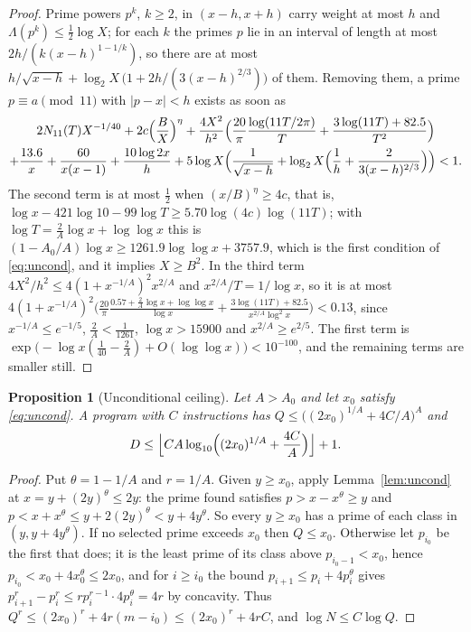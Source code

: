\documentclass[11pt]{article}
\newtheorem{proposition}[theorem]{Proposition}
\theoremstyle{remark}
\begin{document}
\begin{proof}
Prime powers $p^k$, $k\ge2$, in $(x-h,x+h)$ carry weight at most $h$ and
$\Lambda(p^k)\le\frac12\log X$; for each $k$ the primes $p$ lie in an
interval of length at most $2h/(k(x-h)^{1-1/k})$, so there are at most
$h/\sqrt{x-h}+\log_2X\,\bigl(1+2h/(3(x-h)^{2/3})\bigr)$ of them.  Removing
them, a prime $p\equiv a\pmod{11}$ with $|p-x|<h$ exists as soon as
\begin{multline*}
  2N_{11}(T)X^{-1/40}+2c\Bigl(\frac BX\Bigr)^\eta
  +\frac{4X^2}{h^2}\Bigl(\frac{20}\pi\frac{\log(11T/2\pi)}T
  +\frac{3\log(11T)+82.5}{T^2}\Bigr)\\
  +\frac{13.6}x+\frac{60}{x(x-1)}+\frac{10\log2x}h
  +5\log X\Bigl(\frac1{\sqrt{x-h}}+\log_2X\Bigl(\frac1h
  +\frac2{3(x-h)^{2/3}}\Bigr)\Bigr)<1 .
\end{multline*}
The second term is at most $\frac12$ when $(x/B)^\eta\ge4c$, that is,
$\log x-421\log10-99\log T\ge5.70\log(4c)\log(11T)$; with
$\log T=\frac2A\log x+\log\log x$ this is
$(1-A_0/A)\log x\ge1261.9\log\log x+3757.9$, which is the first
condition of \eqref{eq:uncond}, and it implies $X\ge B^2$.  In the third
term $4X^2/h^2\le4(1+x^{-1/A})^2x^{2/A}$ and $x^{2/A}/T=1/\log x$, so it is
at most
$4(1+x^{-1/A})^2\bigl(\frac{20}\pi\frac{0.57+\frac2A\log x+\log\log x}{\log x}
+\frac{3\log(11T)+82.5}{x^{2/A}\log^2x}\bigr)<0.13$, since
$x^{-1/A}\le e^{-1/5}$, $\frac2A<\frac1{1261}$, $\log x>15900$ and
$x^{2/A}\ge e^{2/5}$.  The first
term is $\exp\bigl(-\log x(\frac1{40}-\frac2A)+O(\log\log x)\bigr)<10^{-100}$,
and the remaining terms are smaller still.
\end{proof}

\begin{proposition}[Unconditional ceiling]\label{prop:uncond}
Let $A>A_0$ and let $x_0$ satisfy \eqref{eq:uncond}.  A program with $C$
instructions has $Q\le\bigl((2x_0)^{1/A}+4C/A\bigr)^A$ and
\[
  D\le\Bigl\lfloor CA\log_{10}\Bigl((2x_0)^{1/A}+\frac{4C}A\Bigr)\Bigr\rfloor+1 .
\]
\end{proposition}

\begin{proof}
Put $\theta=1-1/A$ and $r=1/A$.  Given $y\ge x_0$, apply
Lemma~\ref{lem:uncond} at $x=y+(2y)^\theta\le2y$: the prime found satisfies
$p>x-x^\theta\ge y$ and $p<x+x^\theta\le y+2(2y)^\theta<y+4y^\theta$.  So
every $y\ge x_0$ has a prime of each class in $(y,y+4y^\theta)$.  If no
selected prime exceeds $x_0$ then $Q\le x_0$.  Otherwise let $p_{i_0}$ be
the first that does; it is the least prime of its class above
$p_{i_0-1}<x_0$, hence $p_{i_0}<x_0+4x_0^\theta\le2x_0$, and for $i\ge i_0$
the bound $p_{i+1}\le p_i+4p_i^\theta$ gives
$p_{i+1}^r-p_i^r\le rp_i^{r-1}\cdot4p_i^\theta=4r$ by concavity.  Thus
$Q^r\le(2x_0)^r+4r(m-i_0)\le(2x_0)^r+4rC$, and $\log N\le C\log Q$.
\end{proof}
\end{document}
